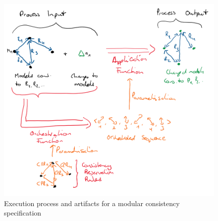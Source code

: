 \begin{figure}
    \centering
    \includegraphics[width=\textwidth]{figures/correctness/notion/execution_process.png}
    \caption[Modular consistency specification execution process and artifacts]{Execution process and artifacts for a modular consistency specification}
    \label{fig:correctness:execution_process}
\end{figure}

